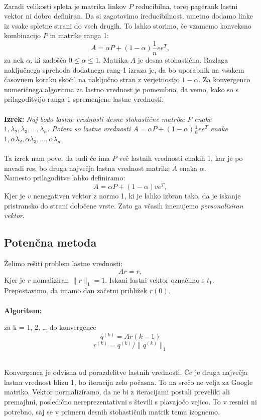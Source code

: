 \documentclass[a4paper]{article}
\begin{document}
\\Zaradi velikosti spleta je matrika linkov $P$ reducibilna, torej pagerank lastni vektor ni dobro definiran. Da si zagotovimo ireducibilnost, umetno dodamo linke iz vsake spletne strani do vseh drugih. To lahko storimo, če vzamemo konveksno kombinacijo $P$ in matrike ranga 1:
$$A=\alpha P + (1-\alpha)\frac{1}{n}ee^T,$$
za nek $\alpha$, ki zadošča $0 \leq \alpha \leq 1$. Matrika $A$ je desna stohastična. Razlaga naključnega sprehoda dodatnega rang-1 izraza je, da bo uporabnik na vsakem časovnem koraku skočil na naključno stran z verjetnostjo $1- \alpha$.
Za konvergenco numeričnega algoritma za lastno vrednost je pomembno, da vemo, kako so s prilagoditvijo ranga-1 spremenjene lastne vrednosti.\\
\\ \textbf{Izrek:} \textit{Naj bodo lastne vrednosti desne stohastične matrike $P$ enake ${1, \lambda_2, \lambda_3, … , \lambda_n}$. Potem so lastne vrednosti $A=\alpha P + (1- \alpha) \frac{1}{n}ee^T$ enake ${1, \alpha \lambda_2, \alpha \lambda_3, … , \alpha \lambda_n}$.}\\
\\
Ta izrek nam pove, da tudi če ima $P$ več lastnih vrednosti enakih 1, kar je po navadi res, bo druga največja lastna vrednost matrike $A$ enaka $\alpha$. \\
Namesto prilagoditve lahko definiramo:
$$A = \alpha P + (1- \alpha)ve^T,$$
Kjer je $v$ nenegativen vektor z normo 1, ki je lahko izbran tako, da je iskanje pristransko do strani določene vrste. Zato ga včasih imenujemo \textit{personaliziran vektor}.

\subsection{Potenčna metoda}
Želimo rešiti problem lastne vrednosti:
$$Ar = r,$$
Kjer je $r$ nomaliziran $\|r\|_1=1$. Iskani lastni vektor označimo s $t_1$. \\
Prepostavimo, da imamo dan začetni približek $r{(0)}$. \\
\\
\textbf{Algoritem:} \\
\begin{center} za k = 1, 2, … do konvergence
	$$q^{(k)} = Ar{(k-1)}$$ 
	$$r^{(k)} = q^{(k)}/ \|q^{(k)}\|_1$$ \\
\end{center}
Konvergenca je odvisna od porazdelitve lastnih vrednosti. Če je druga največja lastna vrednost blizu 1, bo iteracija zelo počasna. To na srečo ne velja za Google matriko. Vektor normaliziramo, da ne bi z iteracijami postali preveliki ali premajhni, posledično nereprezentativni s števili s plavajočo vejico. To v resnici ni potrebno, saj se v primeru desnih stohastičnih matrik temu izognemo.
\end{document}
